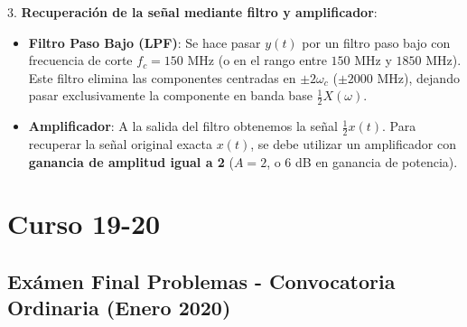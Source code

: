 \begin{resolucion}
3. \textbf{Recuperación de la señal mediante filtro y amplificador}:
   \begin{itemize}
       \item \textbf{Filtro Paso Bajo (LPF)}: Se hace pasar $y(t)$ por un filtro paso bajo con frecuencia de corte $f_c = 150$ MHz (o en el rango entre $150$ MHz y $1850$ MHz). Este filtro elimina las componentes centradas en $\pm 2\omega_c$ ($\pm 2000$ MHz), dejando pasar exclusivamente la componente en banda base $\frac{1}{2} X(\omega)$.
       \item \textbf{Amplificador}: A la salida del filtro obtenemos la señal $\frac{1}{2} x(t)$. Para recuperar la señal original exacta $x(t)$, se debe utilizar un amplificador con \textbf{ganancia de amplitud igual a 2} ($A = 2$, o $6$ dB en ganancia de potencia).
   \end{itemize}
\end{resolucion}

\newpage
\section{Curso 19-20}

\subsection{Exámen Final Problemas - Convocatoria Ordinaria (Enero 2020)}

